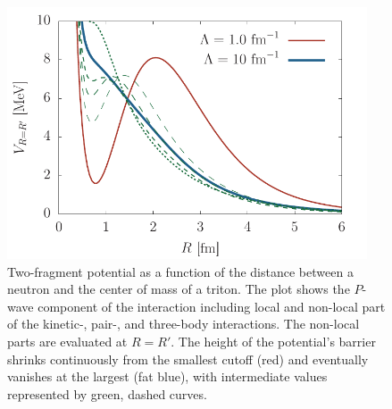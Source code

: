 \documentclass[aps,onecolumn,preprintnumbers,amsmath,amssymb,nofootinbib,superscriptaddress,notitlepage]{revtex4-1}
\newcommand{\figref}[1]{fig.~(\ref{#1})}
\begin{document}
\begin{figure}
\centering
\includegraphics[width=0.95\textwidth]{./Graphs/rgm_potential_nucl} 
\caption{Two-fragment potential as a function of the distance between a
neutron and the center of mass of a triton. The plot shows the $P$-wave component of the
interaction including local and non-local part of the kinetic-, pair-, and three-body interactions.
The non-local parts are evaluated at $R=R'$. The height of the potential's barrier shrinks continuously from
the smallest cutoff (red) and eventually vanishes at the largest (fat blue), with intermediate values represented by green, dashed curves.}
\label{fig:rgm_potential}
\end{figure}
%
\end{document}
